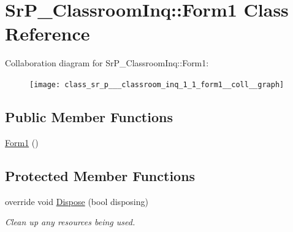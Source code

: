 \hypertarget{class_sr_p___classroom_inq_1_1_form1}{
\section{\-Sr\-P\-\_\-\-Classroom\-Inq\-:\-:\-Form1 \-Class \-Reference}
\label{class_sr_p___classroom_inq_1_1_form1}
}


\-Collaboration diagram for \-Sr\-P\-\_\-\-Classroom\-Inq\-:\-:\-Form1\-:\nopagebreak
\begin{figure}[H]
\begin{center}
\leavevmode
\texttt{[image: class\_sr\_p\_\_\_classroom\_inq\_1\_1\_form1\_\_coll\_\_graph]}
\end{center}
\end{figure}
\subsection*{\-Public \-Member \-Functions}
\begin{DoxyCompactItemize}
\item 
\hyperlink{class_sr_p___classroom_inq_1_1_form1_af6bb96bce0d0e2ee4ecf22e9646d625c}{\-Form1} ()
\end{DoxyCompactItemize}
\subsection*{\-Protected \-Member \-Functions}
\begin{DoxyCompactItemize}
\item 
override void \hyperlink{class_sr_p___classroom_inq_1_1_form1_ac653b186a9b7176d47382c35d7474840}{\-Dispose} (bool disposing)
\begin{DoxyCompactList}\small\item\em \-Clean up any resources being used. \end{DoxyCompactList}\end{DoxyCompactItemize}
